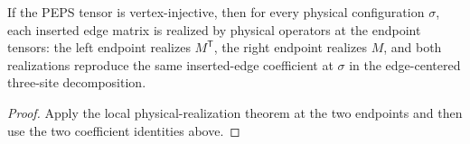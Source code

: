 \begin{theorem}%
    \label{thm:peps_edgeInsertedCoeff_endpointPhysicalRealization}
    \leanok
    If the PEPS tensor is vertex-injective, then for every physical
    configuration $\sigma$, each inserted edge matrix is realized by physical
    operators at the endpoint tensors: the left endpoint realizes
    $M^{\mathsf T}$, the right endpoint realizes $M$, and both realizations
    reproduce the same inserted-edge coefficient at $\sigma$ in the
    edge-centered three-site decomposition.
\end{theorem}
\begin{proof}\leanok
    Apply the local physical-realization theorem at the two endpoints and then
    use the two coefficient identities above.
\end{proof}

